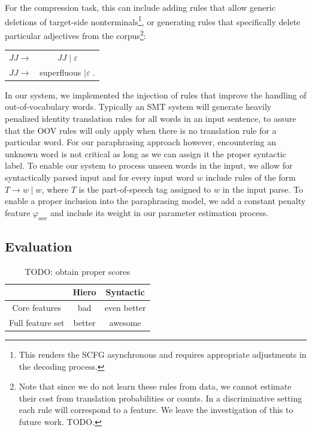 \documentclass[11pt]{article}
\begin{document}
For the compression task, this can include adding rules that allow
generic deletions of target-side nonterminals\footnote{This renders
  the SCFG asynchronous and requires appropriate adjustments in the
  decoding process.}, or generating rules that specifically delete
particular adjectives from the corpus\footnote{Note that since we do
  not learn these rules from data, we cannot estimate their cost from
  translation probabilities or counts. In a discriminative setting
  each rule will correspond to a feature. We leave the investigation
  of this to future work. TODO.}:
\begin{center}
\begin{tabular}{cc}
 $\mathit{JJ} \rightarrow$ & $\mathit{JJ} \mid \varepsilon$ \\
 $\mathit{JJ} \rightarrow$ & superfluous $\mid \varepsilon$ . \\
\end{tabular}
\end{center}
In our system, we implemented the injection of rules that improve the
handling of out-of-vocabulary words. Typically an SMT system will
generate heavily penalized identity translation rules for all words in
an input sentence, to assure that the OOV rules will only apply when
there is no translation rule for a particular word. For our
paraphrasing approach however, encountering an unknown word is not
critical as long as we can assign it the proper syntactic label. To
enable our system to process unseen words in the input, we allow for
syntactically parsed input and for every input word $w$ include rules
of the form $\mathit{T} \rightarrow w \mid w$, where $T$ is the
part-of-speech tag assigned to $w$ in the input parse. To enable a
proper inclusion into the paraphrasing model, we add a constant
penalty feature $\varphi_{\mathit{oov}}$ and include its weight in our
parameter estimation process.

\subsection{Evaluation} \label{evaluation}

\begin{table}
\begin{center}
\begin{tabular}{|c|c|c|}
  \hline
  & Hiero & Syntactic \\
  \hline
  Core features & bad & even better \\
  Full feature set & better & awesome \\
  \hline
\end{tabular}
\end{center}
\caption{TODO: obtain proper scores}
\end{table}
\end{document}
